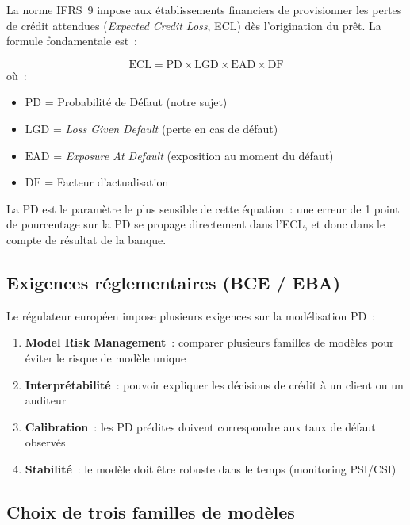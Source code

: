 \documentclass[12pt,a4paper]{article}
\begin{document}
La norme IFRS~9 impose aux \'etablissements financiers de provisionner les pertes de cr\'edit attendues (\textit{Expected Credit Loss}, ECL) d\`es l'origination du pr\^et. La formule fondamentale est~:

\begin{formulebox}
\begin{equation}
    \text{ECL} = \text{PD} \times \text{LGD} \times \text{EAD} \times \text{DF}
    \label{eq:ecl}
\end{equation}
o\`u~:
\begin{itemize}[noitemsep]
    \item $\text{PD}$ = Probabilit\'e de D\'efaut (notre sujet)
    \item $\text{LGD}$ = \textit{Loss Given Default} (perte en cas de d\'efaut)
    \item $\text{EAD}$ = \textit{Exposure At Default} (exposition au moment du d\'efaut)
    \item $\text{DF}$ = Facteur d'actualisation
\end{itemize}
\end{formulebox}

La PD est le param\`etre le plus sensible de cette \'equation~: une erreur de 1 point de pourcentage sur la PD se propage directement dans l'ECL, et donc dans le compte de r\'esultat de la banque.

\subsection{Exigences r\'eglementaires (BCE / EBA)}

Le r\'egulateur europ\'een impose plusieurs exigences sur la mod\'elisation PD~:

\begin{enumerate}[noitemsep]
    \item \textbf{Model Risk Management}~: comparer plusieurs familles de mod\`eles pour \'eviter le risque de mod\`ele unique
    \item \textbf{Interpr\'etabilit\'e}~: pouvoir expliquer les d\'ecisions de cr\'edit \`a un client ou un auditeur
    \item \textbf{Calibration}~: les PD pr\'edites doivent correspondre aux taux de d\'efaut observ\'es
    \item \textbf{Stabilit\'e}~: le mod\`ele doit \^etre robuste dans le temps (monitoring PSI/CSI)
\end{enumerate}

\subsection{Choix de trois familles de mod\`eles}
\end{document}
